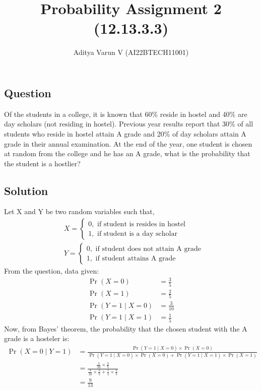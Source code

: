 \documentclass[12pt,onecolumn,notitlepage]{article}
\title{Probability Assignment 2 (12.13.3.3)}
\author{Aditya Varun V (AI22BTECH11001)}
\date{}
\providecommand{\pr}[1]{\ensuremath{\Pr\left(#1\right)}}
\begin{document}
\maketitle
\subsection*{Question}
Of the students in a college, it is known that 60\% reside in hostel and 40\% are
day scholars (not residing in hostel). Previous year results report that 30\% of all
students who reside in hostel attain A grade and 20\% of day scholars attain A
grade in their annual examination. At the end of the year, one student is chosen
at random from the college and he has an A grade, what is the probability that the
student is a hostlier?


\subsection*{Solution}

Let X and Y be two random variables such that,
\begin{align}
 & X =  \begin{cases}
     0, \text{ if student is resides in hostel}\\
     1, \text{ if student is a day scholar} 
 \end{cases}\\
 & Y =  \begin{cases}
     0, \text{ if student does not attain A grade}\\
     1, \text{ if student attains A grade} 
 \end{cases}
\end{align}
From the question, data given:
\begin{align}
	\pr{X=0} &= \frac{3}{5}\\
	\pr{X=1} &= \frac{2}{5}\\
	\pr{Y=1 \mid X=0} &= \frac{3}{10}\\
	\pr{Y=1 \mid X=1} &= \frac{1}{5}
\end{align}
Now, from Bayes' theorem, the probability that the chosen student with the A grade is a hosteler is:
 \begin{align}
 	\pr{X=0 \mid Y=1} &= \frac{\pr{Y=1 \mid X=0}\times\pr{X=0}}{\pr{Y=1 \mid X=0}\times\pr{X=0} + \pr{Y=1 \mid X=1}\times\pr{X=1}}\\
 	&= \frac{\frac{3}{10}\times\frac{3}{5}}{\frac{3}{10}\times\frac{3}{5} + \frac{1}{5}\times\frac{2}{5}}\\
 	&= \frac{9}{13}
 \end{align}
\end{document}
